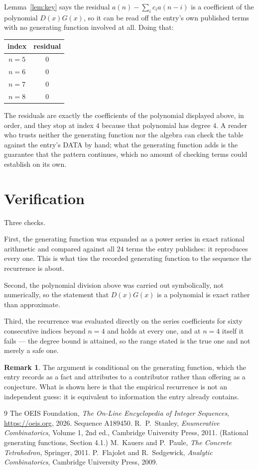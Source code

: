 \documentclass[11pt,a4paper]{article}
\theoremstyle{plain}
\theoremstyle{definition}
\newtheorem{remark}[theorem]{Remark}
\begin{document}
Lemma~\ref{lem:key} says the residual $a(n)-\sum_ic_ia(n-i)$ is a coefficient of the
polynomial $D(x)G(x)$, so it can be read off the entry's own published terms with no
generating function involved at all. Doing that:
\begin{center}
\begin{tabular}{cc}
index & residual \\ \hline
$n=5$ & $0$ \\
$n=6$ & $0$ \\
$n=7$ & $0$ \\
$n=8$ & $0$
\end{tabular}
\end{center}
The residuals are exactly the coefficients of the polynomial displayed above, in order, and
they stop at index $4$ because that polynomial has degree $4$. A reader who trusts
neither the generating function nor the algebra can check the table against the entry's DATA
by hand; what the generating function adds is the guarantee that the pattern continues, which
no amount of checking terms could establish on its own.

\section{Verification}

Three checks.

First, the generating function was expanded as a power series in exact rational arithmetic and
compared against all $24$ terms the entry publishes: it reproduces every one. This is
what ties the recorded generating function to the sequence the recurrence is about.

Second, the polynomial division above was carried out symbolically, not numerically, so the
statement that $D(x)G(x)$ is a polynomial is exact rather than approximate.

Third, the recurrence was evaluated directly on the series coefficients for sixty consecutive
indices beyond $n=4$ and holds at every one, and at $n=4$ itself it fails --- the
degree bound is attained, so the range stated is the true one and not merely a safe one.

\begin{remark}
The argument is conditional on the generating function, which the entry records as a fact and
attributes to a contributor rather than offering as a conjecture. What is shown here is that
the empirical recurrence is not an independent guess: it is equivalent to information the
entry already contains.
\end{remark}

\begin{thebibliography}{9}
 The OEIS Foundation, \emph{The On-Line Encyclopedia of Integer
Sequences}, \url{https://oeis.org}, 2026. Sequence A189450.
 R.~P.~Stanley, \emph{Enumerative Combinatorics}, Volume 1, 2nd ed.,
Cambridge University Press, 2011. (Rational generating functions, Section 4.1.)
 M.~Kauers and P.~Paule, \emph{The Concrete Tetrahedron}, Springer, 2011.
 P.~Flajolet and R.~Sedgewick, \emph{Analytic Combinatorics}, Cambridge
University Press, 2009.
\end{thebibliography}
\end{document}
